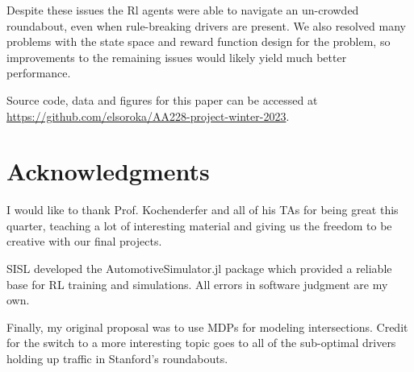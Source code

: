 \documentclass[conference]{IEEEtran}
\begin{document}
Despite these issues the Rl agents were able to navigate an un-crowded roundabout, even when rule-breaking drivers are present. We also resolved many problems with the state space and reward function design for the problem, so improvements to the remaining issues would likely yield much better performance.

Source code, data and figures for this paper can be accessed at \href{https://github.com/elsoroka/AA228-project-winter-2023}{https://github.com/elsoroka/AA228-project-winter-2023}.

\section*{Acknowledgments}
I would like to thank Prof. Kochenderfer and all of his TAs for being great this quarter, teaching a lot of interesting material and giving us the freedom to be creative with our final projects.

SISL developed the AutomotiveSimulator.jl package which provided a reliable base for RL training and simulations. All errors in software judgment are my own.

Finally, my original proposal was to use MDPs for modeling intersections. Credit for the switch to a more interesting topic goes to all of the sub-optimal drivers holding up traffic in Stanford's roundabouts.
\vspace{4em}\\
~
\\
\vspace{13em}


\end{document}
